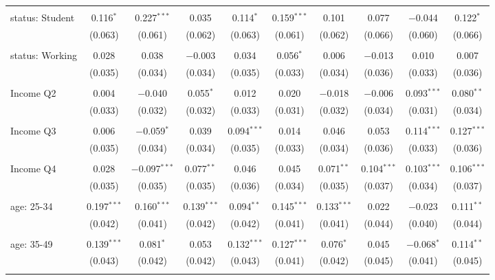 \begin{tabular}{@{\extracolsep{5pt}}lccccccccc}
  & & & & & & & & & \\ 
 status: Student & 0.116$^{*}$ & 0.227$^{***}$ & 0.035 & 0.114$^{*}$ & 0.159$^{***}$ & 0.101 & 0.077 & $-$0.044 & 0.122$^{*}$ \\ 
  & (0.063) & (0.061) & (0.062) & (0.063) & (0.061) & (0.062) & (0.066) & (0.060) & (0.066) \\ 
  & & & & & & & & & \\ 
 status: Working & 0.028 & 0.038 & $-$0.003 & 0.034 & 0.056$^{*}$ & 0.006 & $-$0.013 & 0.010 & 0.007 \\ 
  & (0.035) & (0.034) & (0.034) & (0.035) & (0.033) & (0.034) & (0.036) & (0.033) & (0.036) \\ 
  & & & & & & & & & \\ 
 Income Q2 & 0.004 & $-$0.040 & 0.055$^{*}$ & 0.012 & 0.020 & $-$0.018 & $-$0.006 & 0.093$^{***}$ & 0.080$^{**}$ \\ 
  & (0.033) & (0.032) & (0.032) & (0.033) & (0.031) & (0.032) & (0.034) & (0.031) & (0.034) \\ 
  & & & & & & & & & \\ 
 Income Q3 & 0.006 & $-$0.059$^{*}$ & 0.039 & 0.094$^{***}$ & 0.014 & 0.046 & 0.053 & 0.114$^{***}$ & 0.127$^{***}$ \\ 
  & (0.035) & (0.034) & (0.034) & (0.035) & (0.033) & (0.034) & (0.036) & (0.033) & (0.036) \\ 
  & & & & & & & & & \\ 
 Income Q4 & 0.028 & $-$0.097$^{***}$ & 0.077$^{**}$ & 0.046 & 0.045 & 0.071$^{**}$ & 0.104$^{***}$ & 0.103$^{***}$ & 0.106$^{***}$ \\ 
  & (0.035) & (0.035) & (0.035) & (0.036) & (0.034) & (0.035) & (0.037) & (0.034) & (0.037) \\ 
  & & & & & & & & & \\ 
 age: 25-34 & 0.197$^{***}$ & 0.160$^{***}$ & 0.139$^{***}$ & 0.094$^{**}$ & 0.145$^{***}$ & 0.133$^{***}$ & 0.022 & $-$0.023 & 0.111$^{**}$ \\ 
  & (0.042) & (0.041) & (0.042) & (0.042) & (0.041) & (0.041) & (0.044) & (0.040) & (0.044) \\ 
  & & & & & & & & & \\ 
 age: 35-49 & 0.139$^{***}$ & 0.081$^{*}$ & 0.053 & 0.132$^{***}$ & 0.127$^{***}$ & 0.076$^{*}$ & 0.045 & $-$0.068$^{*}$ & 0.114$^{**}$ \\ 
  & (0.043) & (0.042) & (0.042) & (0.043) & (0.041) & (0.042) & (0.045) & (0.041) & (0.045) \\ 
  & & & & & & & & & \\ 

\end{tabular}
